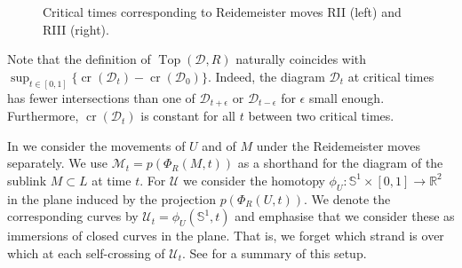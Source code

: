 \documentclass{article}
\newcommand{\R}{\mathbb{R}}
\newcommand{\Sp}{\mathbb{S}}
\newcommand{\control}[2]{ ($#2+#1$) .. #1}
\newcommand{\cross}{\operatorname{cr}}
\newcommand{\addcross}{\operatorname{Top}}
\begin{document}
\begin{figure}[ht]
\begin{center}
\caption{Critical times corresponding to Reidemeister moves RII (left) and RIII (right).}
\label{pic_def_critic}
\end{center}
\end{figure}

Note that the definition of $\addcross(\mathcal{D},R)$ naturally coincides with $\sup_{t\in [0,1]} \{\cross(\mathcal{D}_t) - \cross(\mathcal{D}_0)\} $. Indeed, the diagram $\mathcal{D}_t$ at critical times has fewer intersections than one of $\mathcal{D}_{t+ \epsilon }$ or $\mathcal{D}_{t- \epsilon }$ for $\epsilon$ small enough. Furthermore, $\cross(\mathcal{D}_t)$ is constant for all $t$ between two critical times.

In  we consider the movements of $U$ and of $M$ under the Reidemeister moves separately. 
We use $\mathcal{M}_t = p(\Phi_R(M,t))$ as a shorthand for the diagram of the sublink $M\subset L$ at time $t$. For $\mathcal{U}$ we consider the homotopy $\phi_U: \mathbb{S}^1 \times [0,1] \rightarrow \R^2$ in the plane induced by the projection $p(\Phi_R(U,t))$. We denote the corresponding curves by $\mathcal{U}_t=\phi_U(\Sp^1,t)$ and emphasise that we consider these as immersions of closed curves in the plane. That is, we forget which strand is over which at each self-crossing of $\mathcal{U}_t$. See  for a summary of this setup.
\end{document}
